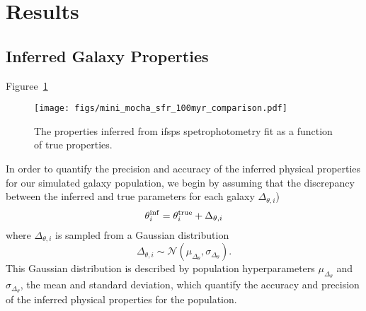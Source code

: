 \section{Results} \label{sec:results}
\subsection{Inferred Galaxy Properties}
Figuree~\ref{fig:prop_inf} 

\begin{figure}
\begin{center}
\texttt{[image: figs/mini\_mocha\_sfr\_100myr\_comparison.pdf]} 
\caption{The properties inferred from ifsps spetrophotometry fit as a function of true properties. 
}
\label{fig:prop_inf}
\end{center}
\end{figure}

In order to quantify the precision and accuracy of the inferred physical
properties for our simulated galaxy population, we begin by assuming that the
discrepancy between the inferred and true parameters for each galaxy 
$\Delta_{\theta,i}$) 
\begin{equation}
    \theta^{\rm inf}_i = \theta^{\rm true}_i + \Delta_{\theta,i}
\end{equation}
where $\Delta_{\theta,i}$ is sampled from a Gaussian distribution
\begin{equation}
    \Delta_{\theta,i} \sim \mathcal{N}(\mu_{\Delta_{\theta}}, \sigma_{\Delta_{\theta}}).
\end{equation}
This Gaussian distribution is described by population hyperparameters $\mu_{\Delta_{\theta}}$ and 
$\sigma_{\Delta_{\theta}}$, the mean and standard deviation, which quantify the accuracy and 
precision of the inferred physical properties for the population. 

